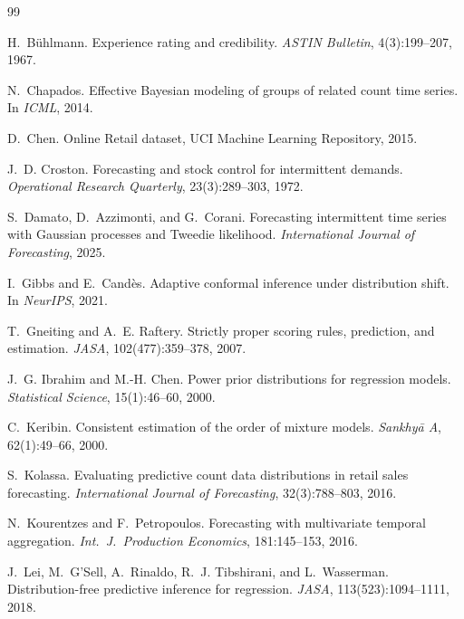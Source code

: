 \documentclass[twocolumn,10pt]{article}
\begin{document}
\begin{thebibliography}{99}

H.~B\"uhlmann.
\newblock Experience rating and credibility.
\newblock \emph{ASTIN Bulletin}, 4(3):199--207, 1967.

N.~Chapados.
\newblock Effective Bayesian modeling of groups of related count time series.
\newblock In \emph{ICML}, 2014.

D.~Chen.
\newblock Online Retail dataset, UCI Machine Learning Repository, 2015.

J.~D. Croston.
\newblock Forecasting and stock control for intermittent demands.
\newblock \emph{Operational Research Quarterly}, 23(3):289--303, 1972.

S.~Damato, D.~Azzimonti, and G.~Corani.
\newblock Forecasting intermittent time series with Gaussian processes and
  Tweedie likelihood.
\newblock \emph{International Journal of Forecasting}, 2025.

I.~Gibbs and E.~Cand\`es.
\newblock Adaptive conformal inference under distribution shift.
\newblock In \emph{NeurIPS}, 2021.

T.~Gneiting and A.~E. Raftery.
\newblock Strictly proper scoring rules, prediction, and estimation.
\newblock \emph{JASA}, 102(477):359--378, 2007.

J.~G. Ibrahim and M.-H. Chen.
\newblock Power prior distributions for regression models.
\newblock \emph{Statistical Science}, 15(1):46--60, 2000.

C.~Keribin.
\newblock Consistent estimation of the order of mixture models.
\newblock \emph{Sankhy\=a A}, 62(1):49--66, 2000.

S.~Kolassa.
\newblock Evaluating predictive count data distributions in retail sales
  forecasting.
\newblock \emph{International Journal of Forecasting}, 32(3):788--803, 2016.

N.~Kourentzes and F.~Petropoulos.
\newblock Forecasting with multivariate temporal aggregation.
\newblock \emph{Int.\ J.\ Production Economics}, 181:145--153, 2016.

J.~Lei, M.~G'Sell, A.~Rinaldo, R.~J. Tibshirani, and L.~Wasserman.
\newblock Distribution-free predictive inference for regression.
\newblock \emph{JASA}, 113(523):1094--1111, 2018.


\end{thebibliography}
\end{document}
